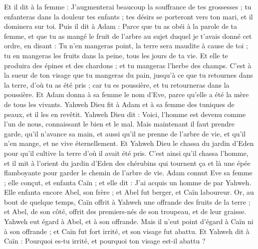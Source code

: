 \begin{multicols}{2}
Et il dit à la femme : J'augmenterai beaucoup la souffrance de tes grossesses ; tu enfanteras dans la douleur tes enfants ; tes désirs se porteront vers ton mari, et il dominera sur toi.
Puis il dit à Adam : Parce que tu as obéi à la parole de ta femme, et que tu as mangé le fruit de l'arbre au sujet duquel je t'avais donné cet ordre, en disant : Tu n'en mangeras point, la terre sera maudite à cause de toi ; tu en mangeras les fruits dans la peine, tous les jours de ta vie.
Et elle te produira des épines et des chardons ; et tu mangeras l'herbe des champs.
C’est à la sueur de ton visage que tu mangeras du pain, jusqu'à ce que tu retournes dans la terre, d’où tu as été pris ; car tu es poussière, et tu retourneras dans la poussière.
Et Adam donna à sa femme le nom d’Eve, parce qu'elle a été la mère de tous les vivants.
Yahweh Dieu fit à Adam et à sa femme des tuniques de peaux, et il les en revêtit.
Yahweh Dieu dit : Voici, l'homme est devenu comme l'un de nous, connaissant le bien et le mal. Mais maintenant il faut prendre garde, qu’il n’avance sa main, et aussi qu’il ne prenne de l'arbre de vie, et qu’il n’en mange, et ne vive éternellement.
Et Yahweh Dieu le chassa du jardin d’Eden pour qu’il cultive la terre d’où il avait été pris.
C’est ainsi qu’il chassa l'homme, et il mit à l’orient du jardin d’Eden des chérubins qui tournent ça et là une épée flamboyante pour garder le chemin de l'arbre de vie.
\VerseOne{}Adam connut Eve sa femme ; elle conçut, et enfanta Caïn ; et elle dit : J'ai acquis un homme de par Yahweh.
Elle enfanta encore Abel, son frère ; et Abel fut berger, et Caïn laboureur.
Or, au bout de quelque temps, Caïn offrit à Yahweh une offrande des fruits de la terre ;
et Abel, de son côté, offrit des premiers-nés de son troupeau, et de leur graisse. Yahweh eut égard à Abel, et à son offrande.
Mais il n'eut point d'égard à Caïn ni à son offrande ; et Caïn fut fort irrité, et son visage fut abattu.
Et Yahweh dit à Caïn : Pourquoi es-tu irrité, et pourquoi ton visage est-il abattu ?

\end{multicols}
